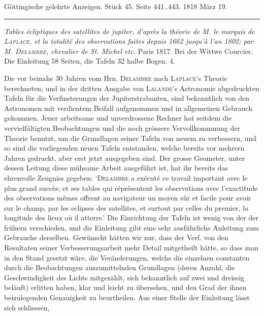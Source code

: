 \clearpage
{}
\hypertarget{native-608-lower}{}
\begin{center}\small Göttingische gelehrte Anzeigen. Stück 45. Seite 441..443. 1818 März 19.\\[3pt]\rule{.72\linewidth}{.3pt}\end{center}

\emph{Tables écliptiques des satellites de jupiter, d'après la théorie de M. le marquis de \textup{\textsc{Laplace}}, et la totalité des observations faites depuis \textup{1662} jusqu'à l'an \textup{1802}; par M. \textup{\textsc{Delambre}}, chevalier de St. Michel etc.} Paris 1817. Bei der Wittwe Courcier. Die Einleitung 58 Seiten, die Tafeln 32 halbe Bogen. 4.

Die vor beinahe 30 Jahren vom Hrn. \textsc{Delambre} nach \textsc{Laplace}'s Theorie berechneten, und in der dritten Ausgabe von \textsc{Lalande}'s Astronomie abgedruckten Tafeln für die Verfinsterungen der Jupiterstrabanten, sind bekanntlich von den Astronomen mit verdientem Beifall aufgenommen und in allgemeinen Gebrauch gekommen. Jener arbeitsame und unverdrossene Rechner hat seitdem die vervielfältigten Beobachtungen und die noch grössere Vervollkommnung der Theorie benutzt, um die Grundlagen seiner Tafeln von neuem zu verbessern, und so sind die vorliegenden neuen Tafeln entstanden, welche bereits vor mehrern Jahren gedruckt, aber erst jetzt ausgegeben sind. Der grosse Geometer, unter dessen Leitung diese mühsame Arbeit ausgeführt ist, hat ihr bereits das ehrenvolle Zeugniss gegeben: `\textsc{Delambre} a exécuté ce travail important avec le plus grand succès; et ses tables qui réprésentent les observations avec l'exactitude des observations mêmes offrent au navigateur un moyen sûr et facile pour avoir sur le champ, par les eclipses des satellites, et surtout par celles du premier, la longitude des lieux où il atterre.' Die Einrichtung der Tafeln ist wenig von der der frühern verschieden, und die Einleitung gibt eine sehr ausführliche Anleitung zum Gebrauche derselben. Gewünscht hätten wir nur, dass der Verf. von den Resultaten seiner Verbesserungsarbeit mehr Detail mitgetheilt hätte, so dass man in den Stand gesetzt wäre, die Veränderungen, welche die einzelnen constanten durch die Beobachtungen auszumittelnden Grundlagen (deren Anzahl, die Geschwindigkeit des Lichts mitgezählt, sich bekanntlich auf zwei und dreissig beläuft) erlitten haben, klar und leicht zu übersehen, und den Grad
der ihnen beizulegenden Genauigkeit zu beurtheilen. Aus einer Stelle der Einleitung lässt sich schliessen,

